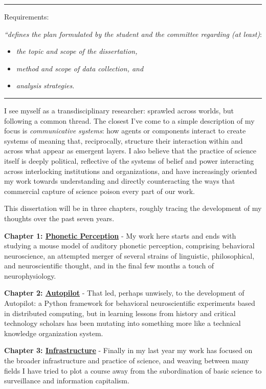 
\hrule
\vspace{1em}

Requirements: 

\textit{``defines the plan formulated by the student and the committee regarding (at least)}:

\begin{itemize}
\item \textit{the topic and scope of the dissertation,}
\item \textit{method and scope of data collection, and}
\item \textit{analysis strategies.}
\end{itemize}

\vspace{1em}
\hrule
\vspace{2em}

I see myself as a transdisciplinary researcher: sprawled across worlds, but following a common thread. The closest I've come to a simple description of my focus is \textit{communicative systems}: how agents or components interact to create systems of meaning that, reciprocally, structure their interaction within and across what appear as emergent layers. I also believe that the practice of science itself is deeply political, reflective of the systems of belief and power interacting across interlocking institutions and organizations, and have increasingly oriented my work towards understanding and directly counteracting the ways that commercial capture of science poison every part of our work.

This dissertation will be in three chapters, roughly tracing the development of my thoughts over the past seven years.

\textbf{Chapter 1: \hyperref[sec:phonemes]{Phonetic Perception}} - My work here starts and ends with studying a mouse model of auditory phonetic perception, comprising behavioral neuroscience, an attempted merger of several strains of linguistic, philosophical, and neuroscientific thought, and in the final few months a touch of neurophysiology. 

\textbf{Chapter 2: \hyperref[sec:autopilot]{Autopilot}} - That led, perhaps unwisely, to the development of Autopilot: a Python framework for behavioral neuroscientific experiments based in distributed computing, but in learning lessons from history and critical technology scholars has been mutating into something more like a technical knowledge organization system. 

\textbf{Chapter 3: \hyperref[sec:infrastructure]{Infrastructure}} - Finally in my last year my work has focused on the broader infrastructure and practice of science, and weaving between many fields I have tried to plot a course away from the subordination of basic science to surveillance and information capitalism. 

